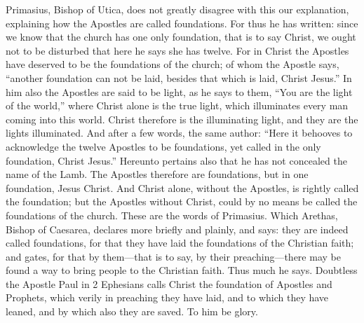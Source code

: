 Primasius, Bishop of Utica, does not greatly disagree with this our explanation, explaining how the Apostles are called foundations. For thus he has written: since we know that the church has one only foundation, that is to say Christ, we ought not to be disturbed that here he says she has twelve. For in Christ the Apostles have deserved to be the foundations of the church; of whom the Apostle says, “another foundation can not be laid, besides that which is laid, Christ Jesus.” In him also the Apostles are said to be light, as he says to them, “You are the light of the world,” where Christ alone is the true light, which illuminates every man coming into this world. Christ therefore is the illuminating light, and they are the lights illuminated. And after a few words, the same author: “Here it behooves to acknowledge the twelve Apostles to be foundations, yet called in the only foundation, Christ Jesus.” Hereunto pertains also that he has not concealed the name of the Lamb. The Apostles therefore are foundations, but in one foundation, Jesus Christ. And Christ alone, without the Apostles, is rightly called the foundation; but the Apostles without Christ, could by no means be called the foundations of the church. These are the words of Primasius. Which Arethas, Bishop of Caesarea, declares more briefly and plainly, and says: they are indeed called foundations, for that they have laid the foundations of the Christian faith; and gates, for that by them—that is to say, by their preaching—there may be found a way to bring people to the Christian faith. Thus much he says. Doubtless the Apostle Paul in 2 Ephesians calls Christ the foundation of Apostles and Prophets, which verily in preaching they have laid, and to which they have leaned, and by which also they are saved. To him be glory.
